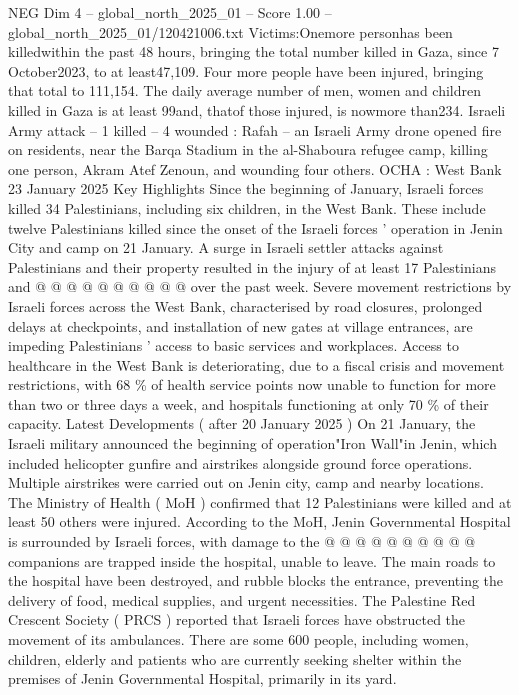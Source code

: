 \begin{textsample}{NEG Dim 4 – global\_north\_2025\_01 – Score 1.00 – global\_north\_2025\_01/120421006.txt}  \label{ex:f4_neg_415}
Victims:Onemore personhas been killedwithin the past 48 hours, bringing the total number killed in Gaza, since 7 October2023, to at least47,109.
Four more people have been injured, bringing that total to 111,154.
The daily average number of men, women and children killed in Gaza is at least 99and, thatof those injured, is nowmore than234.
Israeli Army attack -- 1 killed -- 4 wounded : Rafah -- an Israeli Army drone opened fire on residents, near the Barqa Stadium in the al-Shaboura refugee camp, killing one person, Akram Atef Zenoun, and wounding four others.
OCHA : West Bank 23 January 2025 Key Highlights Since the beginning of January, Israeli forces killed 34 Palestinians, including six children, in the West Bank.
These include twelve Palestinians killed since the onset of the Israeli forces ' operation in Jenin City and camp on 21 January.
A surge in Israeli settler attacks against Palestinians and their property resulted in the injury of at least 17 Palestinians and @ @ @ @ @ @ @ @ @ @ over the past week.
Severe movement restrictions by Israeli forces across the West Bank, characterised by road closures, prolonged delays at checkpoints, and installation of new gates at village entrances, are impeding Palestinians ' access to basic services and workplaces.
Access to healthcare in the West Bank is deteriorating, due to a fiscal crisis and movement restrictions, with 68 \% of health service points now unable to function for more than two or three days a week, and hospitals functioning at only 70 \% of their capacity.
Latest Developments ( after 20 January 2025 ) On 21 January, the Israeli military announced the beginning of operation"Iron Wall"in Jenin, which included helicopter gunfire and airstrikes alongside ground force operations.
Multiple airstrikes were carried out on Jenin city, camp and nearby locations.
The Ministry of Health ( MoH ) confirmed that 12 Palestinians were killed and at least 50 others were injured.
According to the MoH, Jenin Governmental Hospital is surrounded by Israeli forces, with damage to the @ @ @ @ @ @ @ @ @ @ companions are trapped inside the hospital, unable to leave.
The main roads to the hospital have been destroyed, and rubble blocks the entrance, preventing the delivery of food, medical supplies, and urgent necessities.
The Palestine Red Crescent Society ( PRCS ) reported that Israeli forces have obstructed the movement of its ambulances.
There are some 600 people, including women, children, elderly and patients who are currently seeking shelter within the premises of Jenin Governmental Hospital, primarily in its yard.

\end{textsample}

